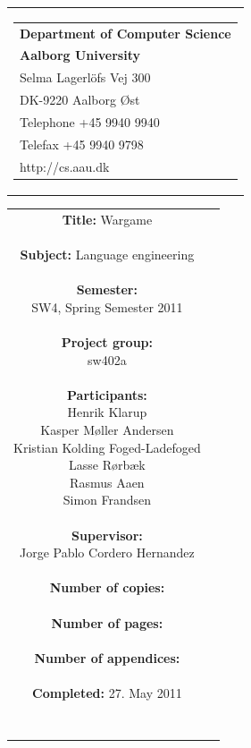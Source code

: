 \begin{nopagebreak}
\samepage 
\begin{tabular}{r}
\parbox{\textwidth}{
\hfill \parbox{6.2cm}{\begin{tabular}{l}
{\textsf\small \textbf{Department of Computer Science }}\\
{\textsf\small  \textbf{Aalborg University}}\\
{\textsf\small Selma Lagerlöfs Vej 300}\\
{\textsf\small DK-9220 Aalborg Øst}\\
{\textsf\small Telephone +45 9940 9940}\\
{\textsf\small Telefax +45 9940 9798}\\
{\textsf\small http://cs.aau.dk}
\end{tabular}}}
\end{tabular}

\begin{tabular}{cc}
\parbox{7cm}{
\textbf{Title:} 
Wargame\\ \\
\textbf{Subject:} 
Language engineering \\ \\
\textbf{Semester:} \\
SW4, Spring Semester 2011\\ \\
\textbf{Project group:} \\
sw402a\\ \\
\textbf{Participants:} \\
Henrik Klarup \\
Kasper Møller Andersen \\
Kristian Kolding Foged-Ladefoged \\
Lasse Rørbæk \\
Rasmus Aaen \\
Simon Frandsen \\ \\
\textbf{Supervisor:} \\
Jorge Pablo Cordero Hernandez \\ \\
\textbf{Number of copies:}
 \\ \\
\textbf{Number of pages:}
 \\ \\
\textbf{Number of appendices:}
 \\ \\
\textbf{Completed:}
27. May 2011 \\ \\ \\
}


\end{tabular}
\end{nopagebreak}
